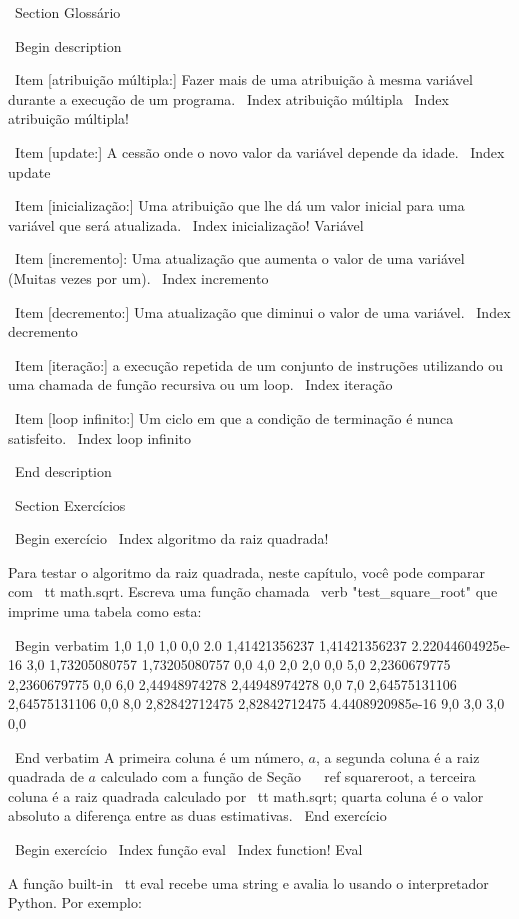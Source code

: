 \documentclass[10pt]{book}
\begin{document}
{{{{\ Section {} Glossário

\ Begin {description}

\ Item [atribuição múltipla:] Fazer mais de uma atribuição à mesma
variável durante a execução de um programa.
\ Index {atribuição múltipla}
\ Index {atribuição múltipla!}

\ Item [update:] A cessão onde o novo valor da variável
depende da idade.
\ Index {update}

\ Item [inicialização:] Uma atribuição que lhe dá um valor inicial para
uma variável que será atualizada.
\ Index {inicialização! Variável}

\ Item [incremento]: Uma atualização que aumenta o valor de uma variável
(Muitas vezes por um).
\ Index {incremento}

\ Item [decremento:] Uma atualização que diminui o valor de uma variável.
\ Index {} decremento

\ Item [iteração:] a execução repetida de um conjunto de instruções utilizando
ou uma chamada de função recursiva ou um loop.
\ Index {iteração}

\ Item [loop infinito:] Um ciclo em que a condição de terminação é
nunca satisfeito.
\ Index {loop infinito}

\ End {description}


\ Section {Exercícios}

\ Begin {} exercício
\ Index {algoritmo da raiz quadrada!}

Para testar o algoritmo da raiz quadrada, neste capítulo, você pode comparar
com {\ tt math.sqrt}. Escreva uma função chamada \ verb "test_square_root"
que imprime uma tabela como esta:

\ Begin {verbatim}
1,0 1,0 1,0 0,0
2.0 1,41421356237 1,41421356237 2.22044604925e-16
3,0 1,73205080757 1,73205080757 0,0
4,0 2,0 2,0 0,0
5,0 2,2360679775 2,2360679775 0,0
6,0 2,44948974278 2,44948974278 0,0
7,0 2,64575131106 2,64575131106 0,0
8,0 2,82842712475 2,82842712475 4.4408920985e-16
9,0 3,0 3,0 0,0

\ End {verbatim}
%
A primeira coluna é um número, $ a $, a segunda coluna é
a raiz quadrada de $ a $ calculado com a função de
Seção ~ \ ref {} squareroot, a terceira coluna é a raiz quadrada calculado
por {\ tt math.sqrt}; quarta coluna é o valor absoluto
a diferença entre as duas estimativas.
\ End {} exercício


\ Begin {} exercício
\ Index {função eval}
\ Index {function! Eval}

A função built-in {\ tt eval} recebe uma string e avalia
lo usando o interpretador Python. Por exemplo:

}}}}
\end{document}

